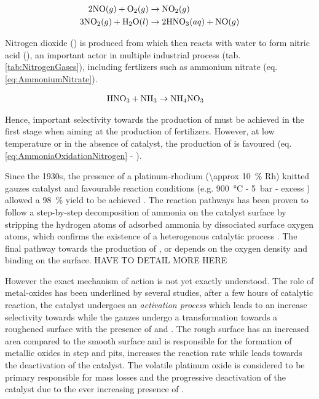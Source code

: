 \begin{align}
    \label{eq:Stage2}
    2 \nitricoxide (g) + \dioxygen (g) & \rightarrow \nitrogendioxide (g) \\
    \label{eq:Stage3}
    3 \nitrogendioxide (g) + \water (l) & \rightarrow 2\nitricacid (aq) + \nitricoxide (g)
\end{align}

Nitrogen dioxide (\nitrogendioxide) is produced from \nitricoxide which then reacts with water to form nitric acid (\nitricacid), an important actor in multiple industrial process (tab. \ref{tab:NitrogenGases}), including fertlizers such as ammonium nitrate (eq. \ref{eq:AmmoniumNitrate}).

\begin{align}
    \label{eq:AmmoniumNitrate}
    \nitricacid + \ammonia & \rightarrow \ammoniumnitrate
\end{align}

Hence, important selectivity towards the production of \nitricoxide must be achieved in the first stage when aiming at the production of fertilizers.
However, at low temperature or in the absence of catalyst, the production of \nitrogen is favoured (eq. \ref{eq:AmmoniaOxidationNitrogen} - \cite{Hatscher2008}).

Since the 1930s, the presence of a platinum-rhodium (\qty{\approx 10}{\percent} Rh) knitted gauzes catalyst and favourable reaction conditions (e.g. \qty{900}{\degreeCelsius} - \qty{5}{\bar} - excess \dioxygen) allowed a \qty{98}{\percent} \nitricoxide yield to be achieved \parencite{Handforth1934, Heck1982}.
The reaction pathways has been proven to follow a step-by-step decomposition of ammonia on the catalyst surface by stripping the hydrogen atoms of adsorbed ammonia by dissociated surface oxygen atoms, which confirms the existence of a heterogenous catalytic process \parencite{Bradley1995,PEREZRAMIREZ2004}.
The final pathway towards the production of \nitrogen, \nitrousoxide or \nitricoxide depends on the oxygen density and binding on the surface.
HAVE TO DETAIL MORE HERE

However the exact mechanism of action is not yet exactly understood.
The role of metal-oxides has been underlined by several studies, after a few hours of catalytic reaction, the catalyst undergoes an \textit{activation process} which leads to an increase selectivity towards \nitricoxide while the gauzes undergo a transformation towards a roughened surface with the presence of  and .
The rough surface has an increased area compared to the smooth surface and is responsible for the formation of metallic oxides in step and pits,  increases the reaction rate while  leads towards the deactivation of the catalyst.
The volatile platinum oxide is considered to be primary responsible for mass losses and the progressive deactivation of the catalyst due to the ever increasing presence of  \parencite{McCabe1986}.


